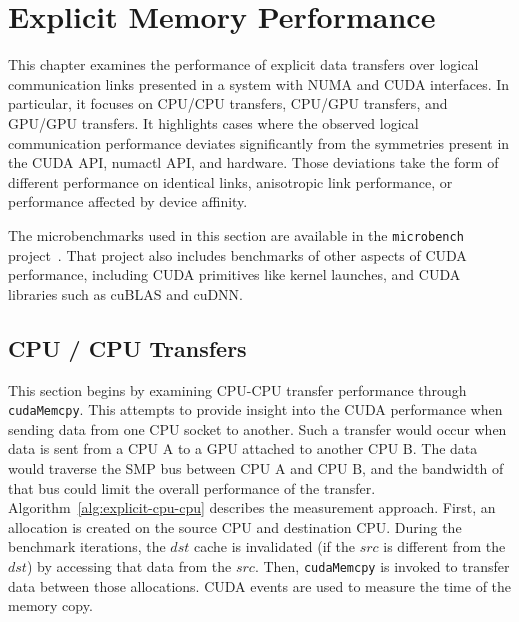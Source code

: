 \chapter{Explicit Memory Performance}
\label{ch:explicit}

This chapter examines the performance of explicit data transfers over logical communication links presented in a system with NUMA and CUDA interfaces.
In particular, it focuses on CPU/CPU transfers, CPU/GPU transfers, and GPU/GPU transfers.
It highlights cases where the observed logical communication performance deviates significantly from the symmetries present in the CUDA API, numactl API, and hardware.
Those deviations take the form of different performance on identical links, anisotropic link performance, or performance affected by device affinity.

The microbenchmarks used in this section are available in the \texttt{microbench} project~\cite{pearson2018microbench}.
That project also includes benchmarks of other aspects of CUDA performance, including CUDA primitives like kernel launches, and CUDA libraries such as cuBLAS and cuDNN.

\section{CPU / CPU Transfers}
\label{sec:explicit-cpu-cpu}

This section begins by examining CPU-CPU transfer performance through \texttt{cudaMemcpy}.
This attempts to provide insight into the CUDA performance when sending data from one CPU socket to another.
Such a transfer would occur when data is sent from a CPU A to a GPU attached to another CPU B.
The data would traverse the SMP bus between CPU A and CPU B, and the bandwidth of that bus could limit the overall performance of the transfer.
Algorithm~\ref{alg:explicit-cpu-cpu} describes the measurement approach.
First, an allocation is created on the source CPU and destination CPU.
During the benchmark iterations, the $dst$ cache is invalidated (if the $src$ is different from the $dst$) by accessing that data from the $src$.
Then, \texttt{cudaMemcpy} is invoked to transfer data between those allocations.
CUDA events are used to measure the time of the memory copy.

